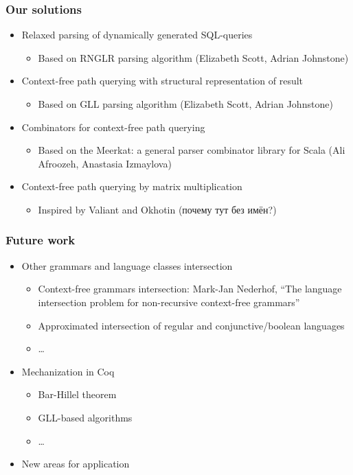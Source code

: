 \documentclass{beamer}
\begin{document}
\begin{frame}
  \transwipe[direction=90]
  \frametitle{Our solutions}
  \begin{itemize}
    \item Relaxed parsing of dynamically generated SQL-queries
    \begin{itemize}
        \item Based on RNGLR parsing algorithm (Elizabeth Scott, Adrian Johnstone)
    \end{itemize}
    \item Context-free path querying with structural representation of result
    \begin{itemize}
        \item Based on GLL parsing algorithm (Elizabeth Scott, Adrian Johnstone)
    \end{itemize}
    \item Combinators for context-free path querying
    \begin{itemize}
        \item Based on the Meerkat: a general parser combinator library for Scala (Ali Afroozeh, Anastasia Izmaylova)
    \end{itemize}
    \item Context-free path querying by matrix multiplication
    \begin{itemize}
        \item Inspired by Valiant and Okhotin (почему тут без имён?)
    \end{itemize}
  \end{itemize}
\end{frame}

\begin{frame}[fragile]
\transwipe[direction=90]
\frametitle{Future work}
\begin{itemize}
  \item Other grammars and language classes intersection
  \begin{itemize}
     \item Context-free grammars intersection: Mark-Jan Nederhof, ``The language intersection problem for non-recursive context-free grammars''
     \item Approximated intersection of regular and conjunctive/boolean languages
     \item \dots
  \end{itemize}
  \item Mechanization in Coq
  \begin{itemize}
     \item Bar-Hillel theorem
     \item GLL-based algorithms
     \item \dots
  \end{itemize}
  \item New areas for application
\end{itemize}
\end{frame}
            
\end{document}
